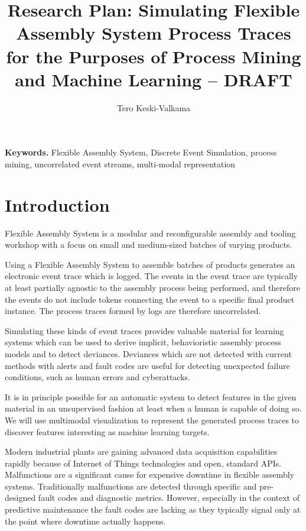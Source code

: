 \documentclass[a4paper,12pt]{article}
\title{Research Plan: Simulating Flexible Assembly System Process Traces for the Purposes of Process Mining and Machine Learning – DRAFT}
\author{Tero Keski-Valkama}
\begin{document}
\maketitle

\smallskip
\noindent \textbf{Keywords.} Flexible Assembly System, Discrete Event Simulation, process mining, uncorrelated event streams, multi-modal representation

\tableofcontents

\newpage
\section{Introduction}
Flexible Assembly System is a modular and reconfigurable assembly and tooling workshop with a focus on small and medium-sized batches of varying products.

Using a Flexible Assembly System to assemble batches of products generates an electronic event trace which is logged. The events in the event trace are typically at least
partially agnostic to the assembly process being performed, and therefore the events do not include tokens connecting the event to a specific final product instance.
The process traces formed by logs are therefore uncorrelated.

Simulating these kinds of event traces provides valuable material for learning systems which can be used to derive implicit, behavioristic assembly process models and
to detect deviances. Deviances which are not detected with current methods with alerts and fault codes are useful for detecting unexpected failure conditions, such as
human errors and cyberattacks.

It is in principle possible for an automatic system to detect features in the given material in an unsupervised fashion at least when a human is capable of doing so.
We will use multimodal visualization to represent the generated process traces to discover features interesting as machine learning targets.

Modern industrial plants are gaining advanced data acquisition capabilities rapidly because of Internet of Things technologies and open, standard APIs.
Malfunctions are a significant cause for expensive downtime in flexible assembly systems. Traditionally malfunctions are detected through specific and pre-designed fault codes
and diagnostic metrics. However, especially in the context of predictive maintenance the fault codes are lacking as they typically signal only at the point where downtime
actually happens.
\end{document}
